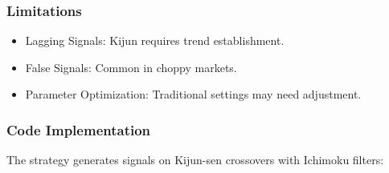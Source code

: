 \documentclass[12pt]{article}
\begin{document}
\subsubsection{Limitations}
\begin{itemize}
\item Lagging Signals: Kijun requires trend establishment.
\item False Signals: Common in choppy markets.
\item Parameter Optimization: Traditional settings may need adjustment.
\end{itemize}

\subsubsection{Code Implementation}
The strategy generates signals on Kijun-sen crossovers with Ichimoku filters:
\end{document}
